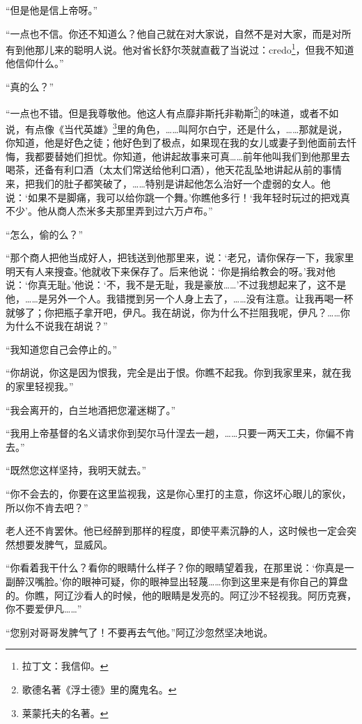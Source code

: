\par “但是他是信上帝呀。”
\par “一点也不信。你还不知道么？他自己就在对大家说，自然不是对大家，而是对所有到他那儿来的聪明人说。他对省长舒尔茨就直截了当说过：credo\footnote{拉丁文：我信仰。}，但我不知道他信仰什么。”
\par “真的么？”
\par “一点也不错。但是我尊敬他。他这人有点靡非斯托非勒斯\footnote{歌德名著《浮士德》里的魔鬼名。}]的味道，或者不如说，有点像《当代英雄》\footnote{莱蒙托夫的名著。}里的角色，……叫阿尔白宁，还是什么，……那就是说，你知道，他是好色之徒；他好色到了极点，如果现在我的女儿或妻子到他面前去忏悔，我都要替她们担忧。你知道，他讲起故事来可真……前年他叫我们到他那里去喝茶，还备有利口酒（太太们常送给他利口酒），他天花乱坠地讲起从前的事情来，把我们的肚子都笑破了，……特别是讲起他怎么治好一个虚弱的女人。他说：‘如果不是脚痛，我可以给你跳一个舞。’你瞧他多行！‘我年轻时玩过的把戏真不少’。他从商人杰米多夫那里弄到过六万卢布。”
\par “怎么，偷的么？”
\par “那个商人把他当成好人，把钱送到他那里来，说：‘老兄，请你保存一下，我家里明天有人来搜查。’他就收下来保存了。后来他说：‘你是捐给教会的呀。’我对他说：‘你真无耻。’他说：‘不，我不是无耻，我是豪放……’不过我想起来了，这不是他，……是另外一个人。我错搅到另一个人身上去了，……没有注意。让我再喝一杯就够了；你把瓶子拿开吧，伊凡。我在胡说，你为什么不拦阻我呢，伊凡？……你为什么不说我在胡说？”
\par “我知道您自己会停止的。”
\par “你胡说，你这是因为恨我，完全是出于恨。你瞧不起我。你到我家里来，就在我的家里轻视我。”
\par “我会离开的，白兰地酒把您灌迷糊了。”
\par “我用上帝基督的名义请求你到契尔马什涅去一趟，……只要一两天工夫，你偏不肯去。”
\par “既然您这样坚持，我明天就去。”
\par “你不会去的，你要在这里监视我，这是你心里打的主意，你这坏心眼儿的家伙，所以你不肯去吧？”
\par 老人还不肯罢休。他已经醉到那样的程度，即使平素沉静的人，这时候也一定会突然想要发脾气，显威风。
\par “你看着我干什么？看你的眼睛什么样子？你的眼睛望着我，在那里说：‘你真是一副醉汉嘴脸。’你的眼神可疑，你的眼神显出轻蔑……你到这里来是有你自己的算盘的。你瞧，阿辽沙看人的时候，他的眼睛是发亮的。阿辽沙不轻视我。阿历克赛，你不要爱伊凡……”
\par “您别对哥哥发脾气了！不要再去气他。”阿辽沙忽然坚决地说。

